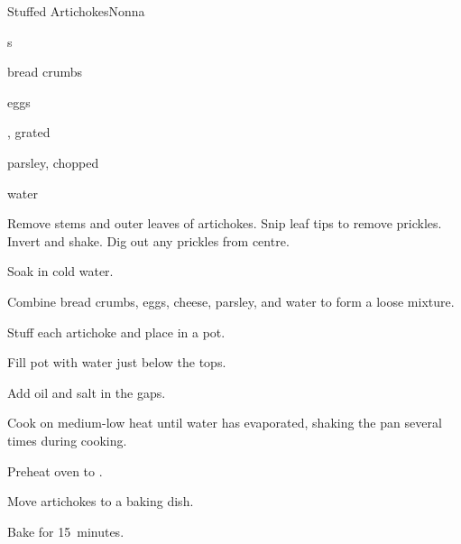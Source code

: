 \begin{recipe}{Stuffed Artichokes}{Nonna}{}

\begin{ingredients}
\item {}s
\item bread crumbs
\item eggs
\item {}, grated
\item parsley, chopped
\item water
\end{ingredients}

\begin{directions}
\item Remove stems and outer leaves of artichokes. Snip leaf tips to remove prickles. Invert and shake. Dig out any prickles from centre.
\item Soak in cold water.
\item Combine bread crumbs, eggs, cheese, parsley, and water to form a loose mixture.
\item Stuff each artichoke and place in a pot.
\item Fill pot with water just below the tops.
\item Add oil and salt in the gaps.
\item Cook on medium-low heat until water has evaporated, shaking the pan several times during cooking.
\item Preheat oven to .
\item Move artichokes to a baking dish.
\item Bake for 15~minutes.
\end{directions}

\end{recipe}
